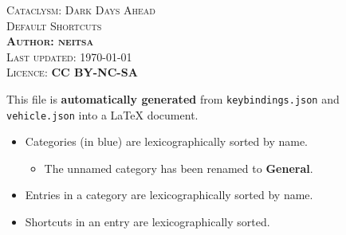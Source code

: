 \documentclass[a4paper]{article}
\begin{document}
    \begin{multicols}{4}
        \begin{mdframed}[style=mystyle]
            \begin{center}
                \selectfont
                \large\scshape{
                Cataclysm: Dark Days Ahead \\
                Default Shortcuts \\\bigskip}
                \normalfont
                \textbf{\large{Author: neitsa}} \\
                \footnotesize Last updated: \today \\
                \footnotesize Licence: \textbf{CC BY-NC-SA}
            \end{center}
        \end{mdframed}

        \begin{mdframed}[style=mystyle_with_color]
            This file is \textbf{automatically generated} from {\small{\tt keybindings.json}} and 
                {\small{\tt vehicle.json}} into a \LaTeX{} document. \\
            \begin{itemize}
              \item Categories (in {\color{blue} blue}) are lexicographically sorted by name.
              \begin{itemize}
                \item The unnamed category has been renamed to \textbf{General}.
              \end{itemize}
              \item Entries \textendash{} in a category \textendash{} are lexicographically sorted by name.
              \item Shortcuts \textendash{} in an entry \textendash{} are lexicographically sorted.
            \end{itemize}
        \end{mdframed}

        \scriptsize
        \bigskip


    \end{multicols}
\end{document}
